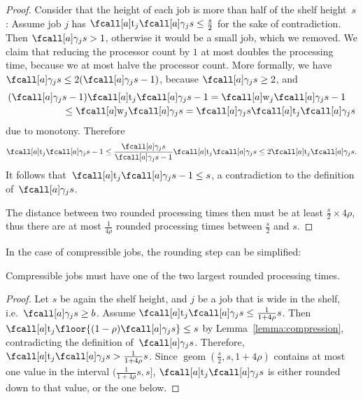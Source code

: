 \begin{proof}
  Consider that the height of each job is more than half of the shelf height~$s$:
  Assume job $j$ has $\ptm{j}{\procnum{j}{s}} \leq \frac{s}{2}$ for the sake of contradiction.
  Then $\procnum{j}{s} > 1$, otherwise it would be a small job, which we removed.
  We claim that reducing the processor count by $1$ at most doubles the processing time,
  because we at most halve the processor count.
  More formally, we have
  $\procnum{j}{s} \leq 2 (\procnum{j}{s} - 1)$, because $\procnum{j}{s} \geq 2$, and
  \begin{equation}
    \begin{multlined}
      (\procnum{j}{s} - 1) \ptm{j}{\procnum{j}{s} - 1} = \work{j}{\procnum{j}{s} - 1} \\
      \leq \work{j}{\procnum{j}{s}} = \procnum{j}{s} \ptm{j}{\procnum{j}{s}}
    \end{multlined}
  \end{equation}    
  due to monotony.
  Therefore
  \begin{equation}
    \ptm{j}{\procnum{j}{s} - 1} \leq \frac{\procnum{j}{s}}{\procnum{j}{s} - 1} \ptm{j}{\procnum{j}{s}}
    \leq 2 \ptm{j}{\procnum{j}{s}} \dpunct{.}
  \end{equation}
  It follows that~$\ptm{j}{\procnum{j}{s}-1} \leq s$, a contradiction to the definition of~$\procnum{j}{s}$.
    
  The distance between two rounded processing times then must be
  at least $\frac{s}{2} \times 4\rho$,
  thus there are at most $\frac{1}{4\rho}$ rounded processing times 
  between $\frac{s}{2}$ and $s$.
\end{proof}

In the case of compressible jobs, the rounding step can be simplified:
\begin{lemma}
  \label{lemma:largest-height}
  Compressible jobs must have one of the two largest rounded processing times.
\end{lemma}

\begin{proof}
  Let $s$ be again the shelf height,
  and $j$ be a job that is wide in the shelf, i.e.~$\procnum{j}{s} \geq b$.
  Assume $\ptm{j}{\procnum{j}{s}} \leq \frac{1}{1+4\rho}s$.
  Then $\ptm{j}{\floor{(1-\rho)\procnum{j}{s}}} \leq s$ by Lemma~\ref{lemma:compression},
  contradicting the definition of~$\procnum{j}{s}$.
  Therefore, $\ptm{j}{\procnum{j}{s}} > \frac{1}{1+4\rho}s$.
  Since $\mathop{\mathrm{geom}}(\frac{s}{2}, s, 1 + 4\rho)$
  contains at most one value in the interval $(\frac{1}{1+4\rho}s, s]$,
  $\ptm{j}{\procnum{j}{s}}$ is either rounded down to that value, or the one below.
\end{proof}

